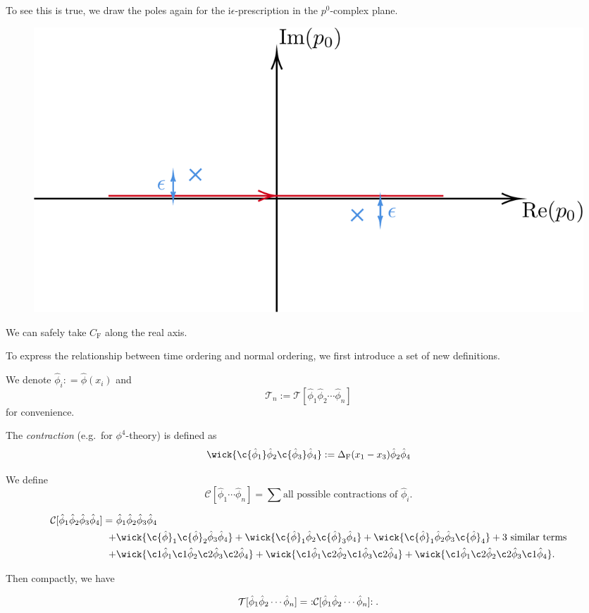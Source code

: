 \documentclass[a4paper,11pt]{article}
\begin{document}
	To see this is true, we draw the poles again for the $\mathrm{i}\epsilon$-prescription in the $p^0$-complex plane.
	
	\begin{figure}[H]
		\centering
		\includegraphics[width=0.65\linewidth]{fig/i-epsilon-prescription.pdf}
	\end{figure}
	
	We can safely take $C_\text{F}$ along the real axis.

	To express the relationship between time ordering and normal ordering, we first introduce a set of new definitions.

	We denote $\hat \phi_i : = \hat \phi(x_i)$ and 
	\[
		\mathcal{T}_n := \mathcal{T}[\hat \phi_1 \hat \phi_2 \cdots \hat \phi_n]
	\]
	for convenience.

	\begin{defi}
		The \emph{contraction} (e.g.\ for $\phi^4$-theory) is defined as 
		\[
			\wick{\c {\hat \phi_1} \hat \phi_2 \c {\hat \phi_3} \hat \phi_4} : = \Delta _{\text{F}}(x_1 - x_3) \hat \phi_2 \hat \phi_4
		\]
	\end{defi}

	\begin{defi}
		We define
		\[
			\mathcal{C}[\hat \phi_1 \cdots \hat \phi_n] = \sum \text{all possible contractions of }\hat \phi_i .
		\]
	\end{defi}

	\begin{ex}
		\begin{align*}
			\mathcal{C}[\hat \phi_1 \hat \phi_2 \hat \phi_3 \hat \phi_4] =\ & \hat \phi_1 \hat \phi_2 \hat \phi_3 \hat \phi_4 \\
			+ &\wick{\c {\hat{\phi}}_1 \c {\hat{\phi}}_2 \hat \phi_3 \hat \phi_4} + \wick{\c {\hat \phi}_1 \hat \phi_2 \c{\hat \phi}_3 \hat \phi_4} + \wick{\c{\hat \phi}_1 \hat \phi_2 \hat \phi_3 \c{\hat \phi}_4} +  \text{3 similar terms}\\
			+ & \wick{\c1 {\hat{\phi}}_1 \c1 {\hat{\phi}}_2 \c2{\hat \phi}_3 \c2{\hat \phi}_4} + \wick{\c1 {\hat{\phi}}_1 \c2 {\hat{\phi}}_2 \c1{\hat \phi}_3 \c2{\hat \phi}_4} + \wick{\c1 {\hat{\phi}}_1 \c2 {\hat{\phi}}_2 \c2{\hat \phi}_3 \c1{\hat \phi}_4}.
		\end{align*}
	\end{ex}
	Then compactly, we have
	\begin{thm}
		\[
			\mathcal{T}[\hat \phi_1 \hat \phi_2 \cdots \hat \phi_n] =\ :\mathrel{\mathcal{C}[\hat \phi_1 \hat \phi_2 \cdots \hat \phi_n]}:.
		\]
	\end{thm}
\end{document}
